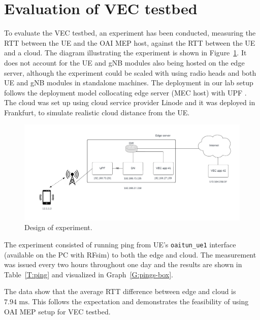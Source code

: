 \documentclass[12pt,a4paper,twoside]{report}
\begin{document}
\section{Evaluation of VEC testbed}
To evaluate the VEC testbed, an experiment has been conducted, measuring the RTT between the UE and the OAI MEP host, against the RTT between the UE and a cloud. The diagram illustrating the experiment is shown in Figure~\ref{F:experiment}. It does not account for the UE and gNB modules also being hosted on the edge server, although the experiment could be scaled with using radio heads and both UE and gNB modules in standalone machines. The deployment in our lab setup follows the deployment model collocating edge server (MEC host) with UPF \cite{ETSI:wp28}. The cloud was set up using cloud service provider Linode and it was deployed in Frankfurt, to simulate realistic cloud distance from the UE.
\begin{figure}[!ht]
	\centering
	\includegraphics[width=\textwidth]{./images/experiment.pdf} 
	\caption{Design of experiment.}
	\label{F:experiment}
\end{figure}
%
The experiment consisted of running ping from UE’s \verb|oaitun_ue1| interface (available on the PC with RFsim) to both the edge and cloud. The measurement was issued every two hours throughout one day and the results are shown in Table~\ref{T:ping} and visualized in Graph~\ref{G:pings-box}. 

The data show that the average RTT difference between edge and cloud is $7.94 \mbox{ ms}$. This follows the expectation and demonstrates the feasibility of using OAI MEP setup for VEC testbed.
\end{document}
